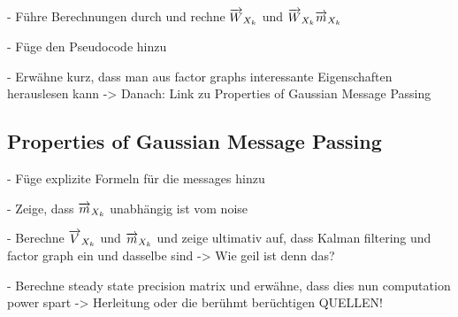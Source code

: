 \noindent - Führe Berechnungen durch und rechne $\overrightarrow{W}_{{X}_{k{}}}$ und $\overrightarrow{W}_{{X}_{k{}}}\overrightarrow{m}_{{X}_{k{}}}$

\noindent - Füge den Pseudocode hinzu

\noindent - Erwähne kurz, dass man aus factor graphs interessante Eigenschaften herauslesen kann -> Danach: Link zu Properties of Gaussian Message Passing

\subsection{Properties of Gaussian Message Passing}

- Füge explizite Formeln für die messages hinzu

\noindent - Zeige, dass $\overrightarrow{m}_{{X}_{k{}}}$ unabhängig ist vom noise

\noindent - Berechne $\overrightarrow{V}_{{X}_{k{}}}$ und $\overrightarrow{m}_{{X}_{k{}}}$ und zeige ultimativ auf, dass Kalman filtering und factor graph ein und dasselbe sind -> Wie geil ist denn das?

\noindent - Berechne steady state precision matrix und erwähne, dass dies nun computation power spart -> Herleitung oder die berühmt berüchtigen QUELLEN!







\clearpage
